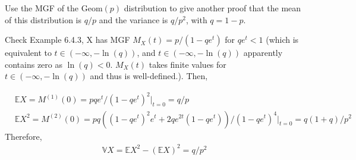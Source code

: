 
\setcounter{theorem}{17}
\begin{exercise} [BH.6.18] Use the MGF of the $\text{Geom}(p)$ distribution to give another proof that the mean of this distribution is $q/p$ and the variance is $q/p^2$, with $q = 1 - p$.
\begin{solution}
    Check Example 6.4.3, X has MGF $M_X(t)= p/(1-qe^t)$ for $qe^t<1$ (which is equivalent to $t\in (-\infty, -\ln(q)) $, and $t\in (-\infty, -\ln(q)) $ apparently contains zero as $\ln(q)<0$. $M_X(t)$ takes finite values for $t\in (-\infty, -\ln(q)) $ and thus is well-defined.). Then,

    \begin{align*}
    	&\mathbb{E}X =M^{(1)}(0) = pqe^t/(1-qe^t)^2|_{t=0} = q/p\\	&\mathbb{E}X^2 =M^{(2)}(0) = pq\left((1-qe^t)^2e^t +2qe^{2t}(1-qe^t) \right)/(1-qe^t)^4|_{t=0} = q(1+q)/p^2
    \end{align*}
    Therefore,
    \begin{align*}
    	\mathbb{V} X = \mathbb{E}X^2 - (\mathbb{E}X)^2 = q/p^2
    \end{align*}
\end{solution}
\end{exercise}

